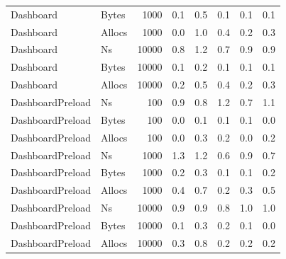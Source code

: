 \begin{table}[ht]
\begin{tabular}{llrrrrrr}
	Dashboard & Bytes & 1000 &  0.1 &  0.5 &  0.1 &  0.1 &  0.1 \\
	Dashboard & Allocs & 1000 &  0.0 &  1.0 &  0.4 &  0.2 &  0.3 \\
	Dashboard & Ns & 10000 &  0.8 &  1.2 &  0.7 &  0.9 &  0.9 \\
	Dashboard & Bytes & 10000 &  0.1 &  0.2 &  0.1 &  0.1 &  0.1 \\
	Dashboard & Allocs & 10000 &  0.2 &  0.5 &  0.4 &  0.2 &  0.3 \\
	DashboardPreload & Ns & 100 &  0.9 &  0.8 &  1.2 &  0.7 &  1.1 \\
	DashboardPreload & Bytes & 100 &  0.0 &  0.1 &  0.1 &  0.1 &  0.0 \\
	DashboardPreload & Allocs & 100 &  0.0 &  0.3 &  0.2 &  0.0 &  0.2 \\
	DashboardPreload & Ns & 1000 &  1.3 &  1.2 &  0.6 &  0.9 &  0.7 \\
	DashboardPreload & Bytes & 1000 &  0.2 &  0.3 &  0.1 &  0.1 &  0.2 \\
	DashboardPreload & Allocs & 1000 &  0.4 &  0.7 &  0.2 &  0.3 &  0.5 \\
	DashboardPreload & Ns & 10000 &  0.9 &  0.9 &  0.8 &  1.0 &  1.0 \\
	DashboardPreload & Bytes & 10000 &  0.1 &  0.3 &  0.2 &  0.1 &  0.0 \\
	DashboardPreload & Allocs & 10000 &  0.3 &  0.8 &  0.2 &  0.2 &  0.2 \\
\bottomrule
\end{tabular}
\label{tab:variationskoeffizienten_pgx}
\end{table}
	